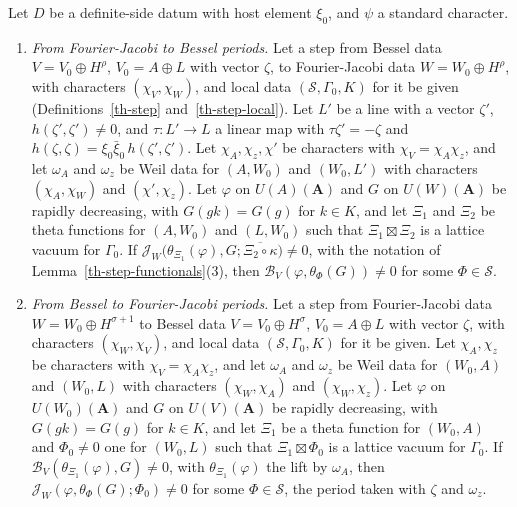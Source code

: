 \begin{proposition}\label{th-step-nonvanishing}
Let $D$ be a definite-side datum with host element $\xi_0$, and $\psi$ a
standard character.
\begin{enumerate}
\item \emph{From Fourier-Jacobi to Bessel periods.} Let a step from Bessel data
  $V=V_0\oplus H^\rho$, $V_0=A\oplus L$ with vector $\zeta$, to Fourier-Jacobi
  data $W=W_0\oplus H^\rho$, with characters $(\chi_V,\chi_W)$, and local data
  $(\mathcal S,\Gamma_0,K)$ for it be given (Definitions~\ref{th-step}
  and~\ref{th-step-local}). Let $L'$ be a line with a vector $\zeta'$,
  $h(\zeta',\zeta')\neq0$, and $\tau\colon L'\to L$ a linear map with
  $\tau\zeta'=-\zeta$ and $h(\zeta,\zeta)=\xi_0\bar\xi_0\,h(\zeta',\zeta')$.
  Let $\chi_A,\chi_z,\chi'$ be characters with $\chi_V=\chi_A\chi_z$, and let
  $\omega_A$ and $\omega_z$ be Weil data for $(A,W_0)$ and $(W_0,L')$ with
  characters $(\chi_A,\chi_W)$ and $(\chi',\chi_z)$. Let $\varphi$ on
  $U(A)(\mathbf A)$ and $G$ on $U(W)(\mathbf A)$ be rapidly decreasing, with
  $G(gk)=G(g)$ for $k\in K$, and let $\Xi_1$ and $\Xi_2$ be theta functions for
  $(A,W_0)$ and $(L,W_0)$ such that $\Xi_1\boxtimes\Xi_2$ is a lattice vacuum
  for $\Gamma_0$. If
  $\mathcal J_W\bigl(\theta_{\Xi_1}(\varphi),G;\overline{\Xi_2\circ\kappa}\bigr)\neq0$,
  with the notation of Lemma~\ref{th-step-functionals}(3), then
  $\mathcal B_V(\varphi,\theta_\Phi(G))\neq0$ for some $\Phi\in\mathcal S$.
\item \emph{From Bessel to Fourier-Jacobi periods.} Let a step from
  Fourier-Jacobi data $W=W_0\oplus H^{\sigma+1}$ to Bessel data
  $V=V_0\oplus H^\sigma$, $V_0=A\oplus L$ with vector $\zeta$, with characters
  $(\chi_W,\chi_V)$, and local data $(\mathcal S,\Gamma_0,K)$ for it be given.
  Let $\chi_A,\chi_z$ be characters with $\chi_V=\chi_A\chi_z$, and let
  $\omega_A$ and $\omega_z$ be Weil data for $(W_0,A)$ and $(W_0,L)$ with
  characters $(\chi_W,\chi_A)$ and $(\chi_W,\chi_z)$. Let $\varphi$ on
  $U(W_0)(\mathbf A)$ and $G$ on $U(V)(\mathbf A)$ be rapidly decreasing, with
  $G(gk)=G(g)$ for $k\in K$, and let $\Xi_1$ be a theta function for $(W_0,A)$
  and $\Phi_0\neq0$ one for $(W_0,L)$ such that $\Xi_1\boxtimes\Phi_0$ is a
  lattice vacuum for $\Gamma_0$. If
  $\mathcal B_V(\theta_{\Xi_1}(\varphi),G)\neq0$, with $\theta_{\Xi_1}(\varphi)$
  the lift by $\omega_A$, then
  $\mathcal J_W(\varphi,\theta_\Phi(G);\Phi_0)\neq0$ for some $\Phi\in\mathcal S$,
  the period taken with $\zeta$ and $\omega_z$.
\end{enumerate}
\end{proposition}
